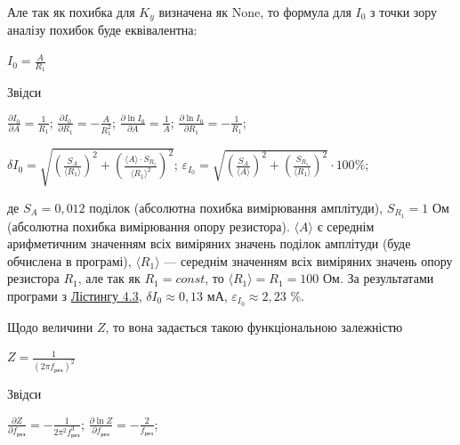 \documentclass[12pt,a4paper]{article}
\begin{document}
    Але так як похибка для $K_y$ визначена як None, то формула для $I_0$ з точки зору аналізу похибок буде еквівалентна:

    \begin{center}
        $\displaystyle I_0 = \frac{A}{R_1}$
    \end{center}

    Звідси

    \begin{center}
        $\displaystyle \frac{\partial I_0}{\partial A} = \frac{1}{R_1}$; $\displaystyle \frac{\partial I_0}{\partial R_1} = -\frac{A}{R_1^2}$;
        $\displaystyle \frac{\partial \ln I_0}{\partial A} = \frac{1}{A}$; $\displaystyle \frac{\partial \ln I_0}{\partial R_1} = -\frac{1}{R_1}$;
    \end{center}

    \begin{center}
        $\displaystyle \delta I_0 = \sqrt{\left( \frac{S_A}{\text{⟨}R_1\text{⟩}} \right)^2 + \left( \frac{\text{⟨}A\text{⟩} \cdot S_{R_1}}{\text{⟨}R_1\text{⟩}^2} \right)^2}$;
        $\displaystyle \varepsilon_{I_0} = \sqrt{\left( \frac{S_A}{\text{⟨}A\text{⟩}} \right)^2 + \left( \frac{S_{R_1}}{\text{⟨}R_1\text{⟩}} \right)^2} \cdot 100 \%$;
    \end{center}

    де $S_A = 0,012$ поділок (абсолютна похибка вимірювання амплітуди), $S_{R_1} = 1$ Ом (абсолютна похибка вимірювання опору резистора).
    $\text{⟨}A\text{⟩}$ є середнім арифметичним значенням всіх виміряних значень поділок амплітуди (буде обчислена в програмі),
    $\text{⟨}R_1\text{⟩}$ --- середнім значенням всіх виміряних значень опору резистора $R_1$, але так як $R_1 = const$, то $\text{⟨}R_1\text{⟩} = R_1 = 100$ Ом.
    За результатами програми з \hyperlink{listing3}{Лістингу 4.3}, $\delta I_0 \approx 0,13$ мА, $\varepsilon_{I_0} \approx 2,23$ \%.

    Щодо величини $Z$, то вона задається такою функціональною залежністю

    \begin{center}
        $\displaystyle Z = \frac{1}{(2\pi f_{\text{рез}})^2}$
    \end{center}

    Звідси

    \begin{center}

        $\displaystyle \frac{\partial Z}{\partial f_{\text{рез}}} = -\frac{1}{2\pi^2 f_{\text{рез}}^3}$; $\displaystyle \frac{\partial \ln Z}{\partial f_{\text{рез}}} = -\frac{2}{f_{\text{рез}}}$;

    \end{center}
\end{document}
